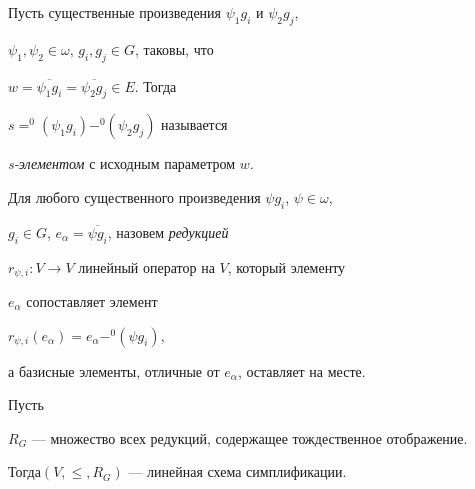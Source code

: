 \begin{defn}


Пусть существенные произведения $\psi_{1}g_{i}$ и $\psi_{2}g_{j}$,


$\psi_{1},\psi_{2}\in\omega$, $g_{i},g_{j}\in G$, таковы, что


$w=\overline{\psi_{1}g_{i}}=\overline{\psi_{2}g_{j}}\in E$. Тогда


$s=^{0}(\psi_{1}g_{i})-^{0}(\psi_{2}g_{j})$ называется


{\it s-элементом} с исходным параметром $w$.


\end{defn}








\begin{defn}


Для любого существенного произведения $\psi g_{i}$, $\psi\in\omega$,


$g_{i}\in G$, $e_{\alpha}=\overline{\psi g_{i}}$, назовем {\it редукцией}


$r_{\psi,i}:V\rightarrow V$  линейный оператор на $V$, который элементу


$e_{\alpha}$ сопоставляет элемент


$r_{\psi,i}(e_{\alpha})=e_{\alpha}-^{0}(\psi g_{i})$,


а базисные элементы, отличные от $e_{\alpha}$, оставляет на месте.


\end{defn}





Пусть


$R_{G}$ --- множество всех редукций, содержащее тождественное отображение.


Тогда\linebreak $(V,\leq,R_{G})$ --- линейная схема симплификации.









